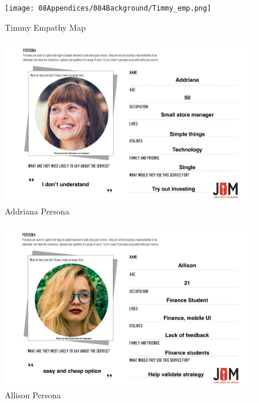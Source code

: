 \documentclass[main.tex]{subfiles}
\begin{document}
 \begin{figure}[H]
    \centering
    \texttt{[image: 08Appendices/084Background/Timmy\_emp.png]}
    \caption{Timmy Empathy Map}
 \end{figure}

 \begin{figure}[H]
    \centering
    \includegraphics[width=1.1\textwidth,height=0.8\textheight]{08Appendices/084Background/Addriana_per.png}
    \caption{Addriana Persona}
 \end{figure}


 \begin{figure}[H]
    \centering
    \includegraphics[width=1.1\textwidth,height=0.8\textheight]{08Appendices/084Background/Allison_per.png}
    \caption{Allison Persona}
 \end{figure}
 
\end{document}
